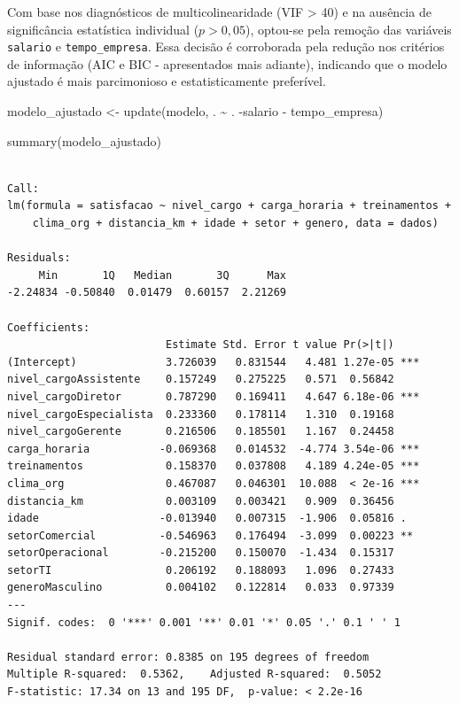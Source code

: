\documentclass[
  letterpaper,
  DIV=11,
  numbers=noendperiod]{scrartcl}
\newenvironment{Shaded}{\begin{snugshade}}{\end{snugshade}}
\newcommand{\FunctionTok}[1]{\textcolor[rgb]{0.28,0.35,0.67}{#1}}
\newcommand{\NormalTok}[1]{\textcolor[rgb]{0.00,0.23,0.31}{#1}}
\newcommand{\OtherTok}[1]{\textcolor[rgb]{0.00,0.23,0.31}{#1}}
\newcommand{\SpecialCharTok}[1]{\textcolor[rgb]{0.37,0.37,0.37}{#1}}
\begin{document}
Com base nos diagnósticos de multicolinearidade (VIF \textgreater{} 40)
e na ausência de significância estatística individual (\(p > 0,05\)),
optou-se pela remoção das variáveis \texttt{salario} e
\texttt{tempo\_empresa}. Essa decisão é corroborada pela redução nos
critérios de informação (AIC e BIC - apresentados mais adiante),
indicando que o modelo ajustado é mais parcimonioso e estatisticamente
preferível.

\begin{Shaded}
\begin{Highlighting}[]
\NormalTok{modelo\_ajustado }\OtherTok{\textless{}{-}} \FunctionTok{update}\NormalTok{(modelo, . }\SpecialCharTok{\textasciitilde{}}\NormalTok{ . }\SpecialCharTok{{-}}\NormalTok{salario }\SpecialCharTok{{-}}\NormalTok{ tempo\_empresa)}

\FunctionTok{summary}\NormalTok{(modelo\_ajustado)}
\end{Highlighting}
\end{Shaded}

\begin{verbatim}

Call:
lm(formula = satisfacao ~ nivel_cargo + carga_horaria + treinamentos + 
    clima_org + distancia_km + idade + setor + genero, data = dados)

Residuals:
     Min       1Q   Median       3Q      Max 
-2.24834 -0.50840  0.01479  0.60157  2.21269 

Coefficients:
                         Estimate Std. Error t value Pr(>|t|)    
(Intercept)              3.726039   0.831544   4.481 1.27e-05 ***
nivel_cargoAssistente    0.157249   0.275225   0.571  0.56842    
nivel_cargoDiretor       0.787290   0.169411   4.647 6.18e-06 ***
nivel_cargoEspecialista  0.233360   0.178114   1.310  0.19168    
nivel_cargoGerente       0.216506   0.185501   1.167  0.24458    
carga_horaria           -0.069368   0.014532  -4.774 3.54e-06 ***
treinamentos             0.158370   0.037808   4.189 4.24e-05 ***
clima_org                0.467087   0.046301  10.088  < 2e-16 ***
distancia_km             0.003109   0.003421   0.909  0.36456    
idade                   -0.013940   0.007315  -1.906  0.05816 .  
setorComercial          -0.546963   0.176494  -3.099  0.00223 ** 
setorOperacional        -0.215200   0.150070  -1.434  0.15317    
setorTI                  0.206192   0.188093   1.096  0.27433    
generoMasculino          0.004102   0.122814   0.033  0.97339    
---
Signif. codes:  0 '***' 0.001 '**' 0.01 '*' 0.05 '.' 0.1 ' ' 1

Residual standard error: 0.8385 on 195 degrees of freedom
Multiple R-squared:  0.5362,    Adjusted R-squared:  0.5052 
F-statistic: 17.34 on 13 and 195 DF,  p-value: < 2.2e-16
\end{verbatim}
\end{document}
